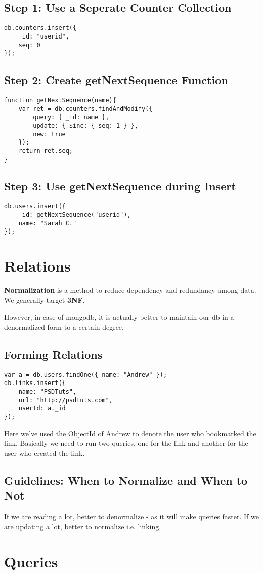 \documentclass[a4paper, 12pt]{article}
\begin{document}
\subsection{Step 1: Use a Seperate Counter Collection}
\begin{verbatim}
db.counters.insert({
    _id: "userid",
    seq: 0
});
\end{verbatim}
\subsection{Step 2: Create getNextSequence Function}
\begin{verbatim}
function getNextSequence(name){
    var ret = db.counters.findAndModify({
        query: { _id: name },
        update: { $inc: { seq: 1 } },
        new: true
    });
    return ret.seq;
}
\end{verbatim}
\subsection{Step 3: Use getNextSequence during Insert}
\begin{verbatim}
db.users.insert({
    _id: getNextSequence("userid"),
    name: "Sarah C."
});
\end{verbatim}

\section{Relations}
\textbf{Normalization} is a method to reduce dependency and redundancy among data. We generally target \textbf{3NF}.

However, in case of mongodb, it is actually better to maintain our db in a denormalized form to a certain degree.
\subsection{Forming Relations}
\begin{verbatim}
var a = db.users.findOne({ name: "Andrew" });
db.links.insert({
    name: "PSDTuts",
    url: "http://psdtuts.com",
    userId: a._id
});
\end{verbatim}
Here we've used the ObjectId of Andrew to denote the user who bookmarked the link. Basically we need to run two queries, one for the link and another for the user who created the link.
\subsection{Guidelines: When to Normalize and When to Not}
If we are reading a lot, better to denormalize - as it will make queries faster. If we are updating a lot, better to normalize i.e. linking.

\section{Queries}
\end{document}
